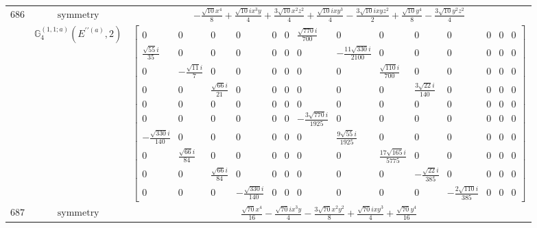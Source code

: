 \documentclass[fleqn,8pt,landscape]{jsarticle}
\begin{document}
\begin{longtable}{ccc}
$ 686 $ & $ \text{symmetry} $ & $ - \frac{\sqrt{10} x^{4}}{8} + \frac{\sqrt{10} i x^{3} y}{4} + \frac{3 \sqrt{10} x^{2} z^{2}}{4} + \frac{\sqrt{10} i x y^{3}}{4} - \frac{3 \sqrt{10} i x y z^{2}}{2} + \frac{\sqrt{10} y^{4}}{8} - \frac{3 \sqrt{10} y^{2} z^{2}}{4} $ \\
$  $ & $ \mathbb{G}_{4}^{(1,1;a)}(E^{\prime\prime(a)},2) $ & $ \begin{bmatrix} 0 & 0 & 0 & 0 & 0 & 0 & \frac{\sqrt{770} i}{700} & 0 & 0 & 0 & 0 & 0 & 0 & 0 \\ \frac{\sqrt{55} i}{35} & 0 & 0 & 0 & 0 & 0 & 0 & - \frac{11 \sqrt{330} i}{2100} & 0 & 0 & 0 & 0 & 0 & 0 \\ 0 & - \frac{\sqrt{11} i}{7} & 0 & 0 & 0 & 0 & 0 & 0 & \frac{\sqrt{110} i}{700} & 0 & 0 & 0 & 0 & 0 \\ 0 & 0 & \frac{\sqrt{66} i}{21} & 0 & 0 & 0 & 0 & 0 & 0 & \frac{3 \sqrt{22} i}{140} & 0 & 0 & 0 & 0 \\ 0 & 0 & 0 & 0 & 0 & 0 & 0 & 0 & 0 & 0 & 0 & 0 & 0 & 0 \\ 0 & 0 & 0 & 0 & 0 & 0 & - \frac{3 \sqrt{770} i}{1925} & 0 & 0 & 0 & 0 & 0 & 0 & 0 \\ - \frac{\sqrt{330} i}{140} & 0 & 0 & 0 & 0 & 0 & 0 & \frac{9 \sqrt{55} i}{1925} & 0 & 0 & 0 & 0 & 0 & 0 \\ 0 & \frac{\sqrt{66} i}{84} & 0 & 0 & 0 & 0 & 0 & 0 & \frac{17 \sqrt{165} i}{5775} & 0 & 0 & 0 & 0 & 0 \\ 0 & 0 & \frac{\sqrt{66} i}{84} & 0 & 0 & 0 & 0 & 0 & 0 & - \frac{\sqrt{22} i}{385} & 0 & 0 & 0 & 0 \\ 0 & 0 & 0 & - \frac{\sqrt{330} i}{140} & 0 & 0 & 0 & 0 & 0 & 0 & - \frac{2 \sqrt{110} i}{385} & 0 & 0 & 0 \end{bmatrix} $ \\ \hline
$ 687 $ & $ \text{symmetry} $ & $ \frac{\sqrt{70} x^{4}}{16} - \frac{\sqrt{70} i x^{3} y}{4} - \frac{3 \sqrt{70} x^{2} y^{2}}{8} + \frac{\sqrt{70} i x y^{3}}{4} + \frac{\sqrt{70} y^{4}}{16} $ \\

\end{longtable}
\end{document}
